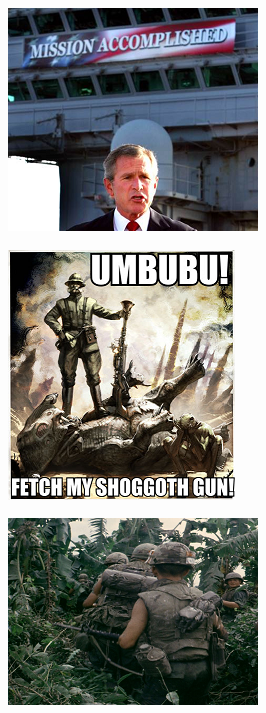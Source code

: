 \begin{figure}
	\begin{center}
		\includegraphics[width=\figwidth]{pics/6/28.png}
	\end{center}
\end{figure}

\begin{figure}
	\begin{center}
		\includegraphics[width=\figwidth]{pics/6/29.png}
	\end{center}
\end{figure}

\begin{figure}
	\begin{center}
		\includegraphics[width=\figwidth]{pics/6/30.png}
	\end{center}
\end{figure}

